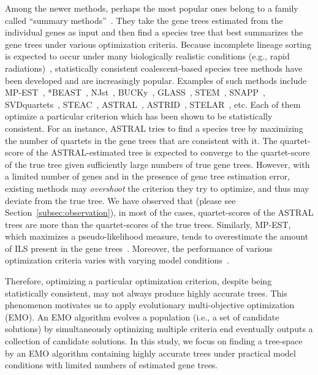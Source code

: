 Among the newer methods, perhaps the most popular ones belong to a family called ``summary methods''~\cite{bayzid2013naive}. They take the gene trees estimated from the individual genes as input and then find a species tree that best summarizes the gene trees under various optimization criteria. 
Because incomplete lineage sorting is
expected to occur under many biologically realistic conditions (e.g., rapid radiations)~\cite{jarvis2014whole}, statistically consistent coalescent-based species tree methods have been developed and are increasingly popular. 
Examples of such methods include
MP-EST~\cite{mpest}, *BEAST~\cite{heled-drummond}, NJst~\cite{njst}, BUCKy~\cite{larget-bioinf2010}, GLASS~\cite{glass}, STEM~\cite{stem}, SNAPP~\cite{snapp}, SVDquartets~\cite{svdquartet}, STEAC~\cite{steac},
ASTRAL~\cite{mirarab2014astral}, ASTRID~\cite{vachaspati2015astrid}, STELAR~\cite{islam2019stelar}, etc. Each of them optimize a particular criterion which has been shown to be statistically consistent. For an instance, ASTRAL tries to find a species tree by maximizing the number of quartets in the gene trees that are consistent with it. The quartet-score of the ASTRAL-estimated tree is expected to converge to the quartet-score of the true tree given sufficiently large numbers of true gene trees. However, with a limited number of genes and in the presence of gene tree estimation error, existing methods may \textit{overshoot} the criterion they try to optimize, and thus may deviate from the true tree. We have observed that (please see Section~\ref{subsec:observation}), in most of the cases, quartet-scores of the ASTRAL trees are more than the quartet-scores of the true trees. Similarly, MP-EST, which maximizes a pseudo-likelihood measure, tends to overestimate the amount of ILS present in the gene trees~\cite{statistical-binning,bayzid2015weighted}. Moreover, the performance of various optimization criteria varies with varying model conditions~\cite{mirarab2014evaluating,chou2015comparative}.


Therefore, optimizing a particular optimization criterion, despite being statistically consistent, may not always produce highly accurate trees. This phenomenon motivates us to apply evolutionary multi-objective optimization (EMO). An EMO algorithm evolves a population (i.e., a set of candidate solutions) by simultaneously optimizing multiple criteria end eventually outputs a collection of candidate solutions. 
In this study, we focus on finding a tree-space by an EMO algorithm containing highly accurate trees under practical model conditions with limited numbers of estimated gene trees. 

